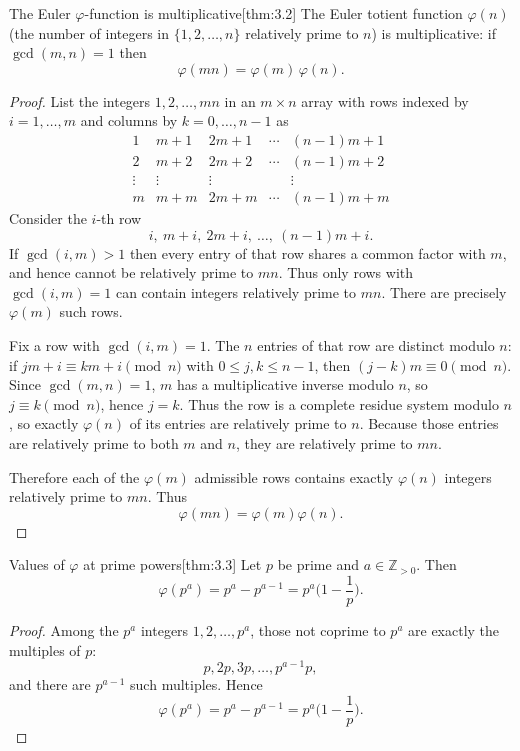 \documentclass[10pt]{article}
\theoremstyle{definition}
\theoremstyle{plain}
\numberwithin{equation}{section}
\begin{document}
\bigskip

\begin{define}{The Euler $\varphi$-function is multiplicative}[thm:3.2]
The Euler totient function $\varphi(n)$ (the number of integers in $\{1,2,\dots,n\}$ relatively prime to $n$) is multiplicative: if $\gcd(m,n)=1$ then
\[
\varphi(mn)=\varphi(m)\,\varphi(n).
\]
\end{define}

\begin{proof}
List the integers $1,2,\dots,mn$ in an $m\times n$ array with rows indexed by $i=1,\dots,m$ and columns by $k=0,\dots,n-1$ as
\[
\begin{array}{ccccc}
1 & m+1 & 2m+1 & \cdots & (n-1)m+1\\
2 & m+2 & 2m+2 & \cdots & (n-1)m+2\\
\vdots & \vdots & \vdots & & \vdots\\
m & m+m & 2m+m & \cdots & (n-1)m+m
\end{array}
\]
Consider the $i$-th row
\[
i,\ m+i,\ 2m+i,\ \dots,\ (n-1)m+i.
\]
If $\gcd(i,m)>1$ then every entry of that row shares a common factor with $m$, and hence cannot be relatively prime to $mn$. Thus only rows with $\gcd(i,m)=1$ can contain integers relatively prime to $mn$. There are precisely $\varphi(m)$ such rows.

Fix a row with $\gcd(i,m)=1$. The $n$ entries of that row are distinct modulo $n$:
if $jm+i\equiv km+i\pmod n$ with $0\le j,k\le n-1$, then $(j-k)m\equiv 0\pmod n$. Since $\gcd(m,n)=1$, $m$ has a multiplicative inverse modulo $n$, so $j\equiv k\pmod n$, hence $j=k$. Thus the row is a complete residue system modulo $n$, so exactly $\varphi(n)$ of its entries are relatively prime to $n$. Because those entries are relatively prime to both $m$ and $n$, they are relatively prime to $mn$.

Therefore each of the $\varphi(m)$ admissible rows contains exactly $\varphi(n)$ integers relatively prime to $mn$. Thus
\[
\varphi(mn)=\varphi(m)\varphi(n).
\]
\end{proof}

\begin{define}{Values of $\varphi$ at prime powers}[thm:3.3]
Let $p$ be prime and $a\in\mathbb{Z}_{>0}$. Then
\[
\varphi(p^a)=p^a-p^{a-1}=p^a\Big(1-\frac{1}{p}\Big).
\]
\end{define}

\begin{proof}
Among the $p^a$ integers $1,2,\dots,p^a$, those not coprime to $p^a$ are exactly the multiples of $p$:
\[
p,2p,3p,\dots,p^{a-1}p,
\]
and there are $p^{a-1}$ such multiples. Hence
\[
\varphi(p^a)=p^a-p^{a-1}=p^a\Big(1-\frac{1}{p}\Big).
\]
\end{proof}
\end{document}
